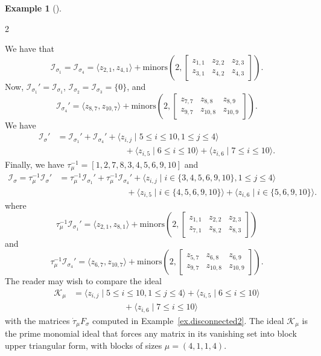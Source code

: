 \documentclass[11pt]{amsart}
\theoremstyle{remark}
\theoremstyle{remark}
\theoremstyle{definition}
\theoremstyle{definition}
\theoremstyle{definition}
\newtheorem{eg_no_qed}[theorem]{Example}
\newenvironment{ex}[1][]{\begin{eg_no_qed}[#1]\renewcommand{\qedsymbol}{$\Diamond$}\pushQED{\qed}}{\popQED\end{eg_no_qed}}
\numberwithin{equation}{section}
\newcommand{\gs}{\sigma}
\newcommand{\ci}{\mathcal{I}}
\newcommand{\cell}{F_\gs}
\begin{document}
\begin{ex}
\begin{multicols}{2}
\end{multicols}
\vspace*{-.1in}
\noindent We have that 
\[
\ci_{\gs_1}=\ci_{\gs_4} = \langle z_{2,1}, z_{4,1} \rangle + \mathrm{minors}\left(2, \begin{bmatrix} z_{1,1} & z_{2,2} & z_{2,3}\\ z_{3,1} & z_{4,2} & z_{4,3} \end{bmatrix} \right).
\]
Now, $\ci_{\gs_1}'=\ci_{\gs_1}$, $\ci_{\gs_2}=\ci_{\gs_3} = \{0\}$, and 
\[
\ci_{\gs_4}' = \langle z_{8,7}, z_{10,7} \rangle + \mathrm{minors}\left(2, \begin{bmatrix} z_{7,7} & z_{8,8} & z_{8,9}\\ z_{9,7} & z_{10,8} & z_{10,9} \end{bmatrix} \right).
\]
We have 
\begin{align*}
\ci_\gs' &= \ci_{\gs_1}' + \ci_{\gs_4}' + \langle z_{i,j} \mid 5\leq i \leq 10, 1\leq j \leq 4 \rangle \\
& \quad\quad\quad\quad \qquad\qquad + \langle z_{i,5} \mid 6\leq i \leq 10  \rangle+\langle z_{i,6} \mid 7\leq i \leq 10 \rangle.
\end{align*}
Finally, we have $\tau_\mu^{-1} = [1,2,7,8,3,4,5,6,9,10]$ and
\begin{align*}
\ci_\gs = \tau_\mu^{-1} \ci_{\gs}' &= \tau_\mu^{-1}\ci_{\gs_1}' + \tau_\mu^{-1}\ci_{\gs_4}' + \langle z_{i,j} \mid i\in \{3,4,5,6,9,10\}, 1\leq j \leq 4 \rangle \\
& \quad\quad\quad\quad \qquad\qquad + \langle z_{i,5} \mid i\in \{4,5,6,9,10\}  \rangle+\langle z_{i,6} \mid i\in \{5,6,9,10\} \rangle.
\end{align*}
where 
\[
 \tau_\mu^{-1}\ci_{\gs_1}' = \langle z_{2,1}, z_{8,1} \rangle + \mathrm{minors}\left(2, \begin{bmatrix} z_{1,1} & z_{2,2} & z_{2,3}\\ z_{7,1} & z_{8,2} & z_{8,3} \end{bmatrix} \right)
\]
and
\[
 \tau_\mu^{-1}\ci_{\gs_4}' = \langle z_{6,7}, z_{10,7} \rangle + \mathrm{minors}\left(2, \begin{bmatrix} z_{5,7} & z_{6,8} & z_{6,9}\\ z_{9,7} & z_{10,8} & z_{10,9} \end{bmatrix} \right).
\]
The reader may wish to compare the ideal
\begin{align*}
\mathcal{K}_\mu &= \langle z_{i,j} \mid 5\leq i \leq 10, 1\leq j \leq 4 \rangle  + \langle z_{i,5} \mid 6\leq i \leq 10  \rangle \\
 &\qquad \qquad \qquad +\langle z_{i,6} \mid 7\leq i \leq 10 \rangle
\end{align*}
with the matrices $\dot\tau_\mu \cell$ computed in Example~\ref{ex.disconnected2}. The ideal $\mathcal{K}_\mu$ is the prime monomial ideal that forces any matrix in its vanishing set into block upper triangular form, with blocks of sizes $\mu = (4,1,1,4)$. 
\end{ex}
\end{document}
